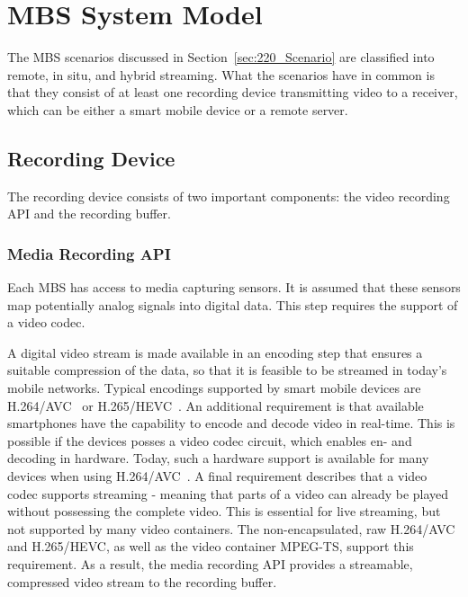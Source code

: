 \section{MBS System Model}
\label{sec:520_SystemModel}
The \ac{MBS} scenarios discussed in Section~\ref{sec:220_Scenario} are classified into remote, in situ, and hybrid streaming.
What the scenarios have in common is that they consist of at least one recording device transmitting video to a receiver, which can be either a smart mobile device or a remote server.
\subsection{Recording Device}
The recording device consists of two important components: the video recording \ac{API} and the recording buffer.
\subsubsection{Media Recording API}
Each \ac{MBS} has access to media capturing sensors. 
It is assumed that these sensors map potentially analog signals into digital data. 
This step requires the support of a video codec. 

A digital video stream is made available in an encoding step that ensures a suitable compression of the data, so that it is feasible to be streamed in today's mobile networks.
Typical encodings supported by smart mobile devices are H.264/\ac{AVC}~\cite{Wiegand2003} or H.265/\ac{HEVC}~\cite{Sullivan2012}.
An additional requirement is that available smartphones have the capability to encode and decode video in real-time.
This is possible if the devices posses a video codec circuit, which enables en- and decoding in hardware.
Today, such a hardware support is available for many devices when using H.264/\ac{AVC}~\cite{Wiegand2003}.
A final requirement describes that a video codec supports streaming - meaning that parts of a video can already be played without possessing the complete video.
This is essential for live streaming, but not supported by many video containers.
The non-encapsulated, raw H.264/\ac{AVC} and H.265/\ac{HEVC}, as well as the video container \ac{MPEG-TS}, support this requirement.
As a result, the media recording \ac{API} provides a streamable, compressed video stream to the recording buffer.
